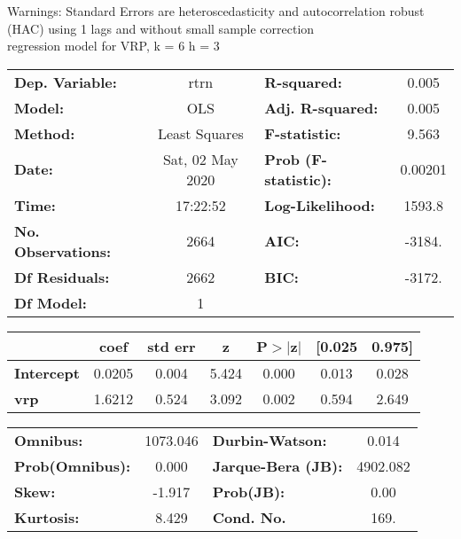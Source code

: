 Warnings: \newline
 [1] Standard Errors are heteroscedasticity and autocorrelation robust (HAC) using 1 lags and without small sample correction\\ 

regression model for VRP, k = 6 h = 3\begin{center}
\begin{tabular}{lclc}
\toprule
\textbf{Dep. Variable:}    &       rtrn       & \textbf{  R-squared:         } &     0.005   \\
\textbf{Model:}            &       OLS        & \textbf{  Adj. R-squared:    } &     0.005   \\
\textbf{Method:}           &  Least Squares   & \textbf{  F-statistic:       } &     9.563   \\
\textbf{Date:}             & Sat, 02 May 2020 & \textbf{  Prob (F-statistic):} &  0.00201    \\
\textbf{Time:}             &     17:22:52     & \textbf{  Log-Likelihood:    } &    1593.8   \\
\textbf{No. Observations:} &        2664      & \textbf{  AIC:               } &    -3184.   \\
\textbf{Df Residuals:}     &        2662      & \textbf{  BIC:               } &    -3172.   \\
\textbf{Df Model:}         &           1      & \textbf{                     } &             \\
\bottomrule
\end{tabular}
\begin{tabular}{lcccccc}
                   & \textbf{coef} & \textbf{std err} & \textbf{z} & \textbf{P$> |$z$|$} & \textbf{[0.025} & \textbf{0.975]}  \\
\midrule
\textbf{Intercept} &       0.0205  &        0.004     &     5.424  &         0.000        &        0.013    &        0.028     \\
\textbf{vrp}       &       1.6212  &        0.524     &     3.092  &         0.002        &        0.594    &        2.649     \\
\bottomrule
\end{tabular}
\begin{tabular}{lclc}
\textbf{Omnibus:}       & 1073.046 & \textbf{  Durbin-Watson:     } &    0.014  \\
\textbf{Prob(Omnibus):} &   0.000  & \textbf{  Jarque-Bera (JB):  } & 4902.082  \\
\textbf{Skew:}          &  -1.917  & \textbf{  Prob(JB):          } &     0.00  \\
\textbf{Kurtosis:}      &   8.429  & \textbf{  Cond. No.          } &     169.  \\
\bottomrule
\end{tabular}
\end{center}


